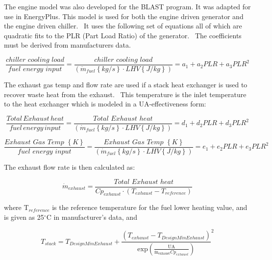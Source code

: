 The engine model was also developed for the BLAST program. It was adapted for use in EnergyPlus. This model is used for both the engine driven generator and the engine driven chiller.~ It uses the following set of equations all of which are quadratic fits to the PLR (Part Load Ratio) of the generator.~ The coefficients must be derived from manufacturers data.

\begin{equation}
\frac{{chiller\,\,cooling\,\,load}}{{fuel\,\,energy\,\,input}} = \frac{{chiller\,\,cooling\,\,load}}{{\left( {{{\dot m}_{fuel}}\left\{ {kg/s} \right\} \cdot LHV\left\{ {J/kg} \right\}} \right)}} = {a_1} + {a_2}PLR + {a_3}PL{R^2}
\end{equation}

The exhaust gas temp and flow rate are used if a stack heat exchanger is used to recover waste heat from the exhaust.~ This temperature is the inlet temperature to the heat exchanger which is modeled in a UA-effectiveness form:

\begin{equation}
\frac{{Total\,Exhaust\,heat}}{{fuel\,energy\,input}} = \frac{{Total\,\,Exhaust\,\,heat}}{{\left( {{{\dot m}_{fuel}}\left\{ {kg/s} \right\} \cdot LHV\left\{ {J/kg} \right\}} \right)}} = {d_1} + {d_2}PLR + {d_3}PL{R^2}
\end{equation}

\begin{equation}
\frac{{Exhaust\,\,Gas\,\,Temp\,\,\left\{ K \right\}}}{{fuel\,\,energy\,\,input}} = \frac{{Exhaust\,\,Gas\,\,Temp\,\,\left\{ K \right\}}}{{\left( {{{\dot m}_{fuel}}\left\{ {kg/s} \right\} \cdot LHV\left\{ {J/kg} \right\}} \right)}} = {e_1} + {e_2}PLR + {e_3}PL{R^2}
\end{equation}

The exhaust flow rate is then calculated as:

\begin{equation}
{\dot m_{exhaust}} = \frac{{Total\,\,Exhaust\,\,heat}}{{C{p_{exhaust}} \cdot \left( {{T_{exhaust}} - {T_{reference}}} \right)}}
\end{equation}

where T\(_{reference}\) is the reference temperature for the fuel lower heating value, and is given as 25\(^{\circ}\)C in manufacturer's data, and

\begin{equation}
{T_{stack}} = {T_{DesignMinExhaust}} + {\frac{{\left( {{T_{exhaust}} - {T_{DesignMinExhaust}}} \right)}}{{{\mathrm{exp}}\left( {\frac{{{\mathrm{UA}}}}{{{{{\mathrm{\dot m}}}_{{\mathrm{exhaust}}}}C{p_{exhaust}}}}} \right)}}^2}
\end{equation}

